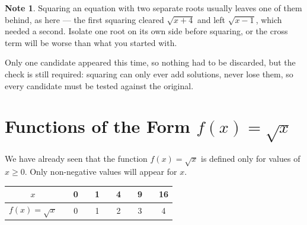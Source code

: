 \documentclass[11pt,a4paper]{article}
\theoremstyle{definition}
\newtheorem{note}[thm]{Note}
\begin{document}
\begin{note}
Squaring an equation with two separate roots usually leaves one of them behind, as
here --- the first squaring cleared $\sqrt{x+4}$ and left $\sqrt{x-1}$, which needed
a second. Isolate one root on its own side before squaring, or the cross term will
be worse than what you started with.

Only one candidate appeared this time, so nothing had to be discarded, but the
check is still required: squaring can only ever add solutions, never lose them, so
every candidate must be tested against the original.
\end{note}

\pagebreak
\section{Functions of the Form $f(x)=\sqrt{x}$}
We have already seen that the function $f(x)=\sqrt{x}$ is defined only for values of $x\geq 0$. Only non-negative values will appear for $x$.\\

\begin{table}[H]
\centering
\begin{tabular}{c|cccccccccc}
$x$ && 0 && 1 && 4 && 9 && 16\\
\hline
$f(x)=\sqrt{x}$ && 0 && 1 && 2 && 3 && 4\\
\end{tabular}
\end{table}
\vspace{0.4cm}



\begin{figure}[H]
\centering
{}
\end{figure}
\vspace{1cm}
\end{document}
